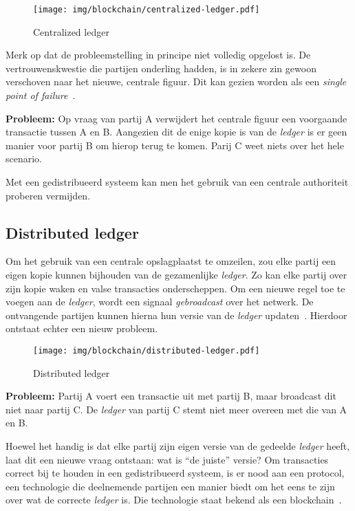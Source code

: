 \begin{figure}[H]
	\centering
	\texttt{[image: img/blockchain/centralized-ledger.pdf]}
	\caption{\label{fig:centralized-ledger}Centralized ledger}
\end{figure}

Merk op dat de probleemstelling in principe niet volledig opgelost is. De vertrouwenskwestie die partijen onderling hadden, is in zekere zin gewoon verschoven naar het nieuwe, centrale figuur. Dit kan gezien worden als een \textit{single point of failure}~\autocite{Majaski2021}.

\textbf{Probleem:} 
Op vraag van partij A verwijdert het centrale figuur een voorgaande transactie tussen A en B. 
Aangezien dit de enige kopie is van de \textit{ledger} is er geen manier voor partij B om hierop terug te komen. Parij C weet niets over het hele scenario.

Met een gedistribueerd systeem kan men het gebruik van een centrale authoriteit proberen vermijden.


\subsection{Distributed ledger}
\label{sub:distributed-ledger}

Om het gebruik van een centrale opslagplaatst te omzeilen, zou elke partij een eigen kopie kunnen bijhouden van de gezamenlijke \textit{ledger}. Zo kan elke partij over zijn kopie waken en valse transacties onderscheppen. Om een nieuwe regel toe te voegen aan de \textit{ledger}, wordt een signaal \textit{gebroadcast} over het netwerk. De ontvangende partijen kunnen hierna hun versie van de \textit{ledger} updaten~\autocite{Nakamoto2008}. Hierdoor ontstaat echter een nieuw probleem.

\begin{figure}[H]
	\centering
	\texttt{[image: img/blockchain/distributed-ledger.pdf]}
	\caption{\label{fig:distributed-ledger}Distributed ledger}
\end{figure}

\textbf{Probleem:} Partij A voert een transactie uit met partij B, maar broadcast dit niet naar partij C. De \textit{ledger} van partij C stemt niet meer overeen met die van A en B.

Hoewel het handig is dat elke partij zijn eigen versie van de gedeelde \textit{ledger} heeft, laat dit een nieuwe vraag ontstaan: wat is ``de juiste'' versie? Om transacties correct bij te houden in een gedistribueerd systeem, is er nood aan een protocol, een technologie die deelnemende partijen een manier biedt om het eens te zijn over wat de correcte \textit{ledger} is. Die technologie staat bekend als een blockchain~\autocite{Chaudhry2018}.


